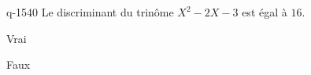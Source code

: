 \begin{truefalse}{q-1540}
Le discriminant du trinôme $X^2-2X-3$ est égal à $16$.
\item* Vrai
\item Faux
\end{truefalse}

